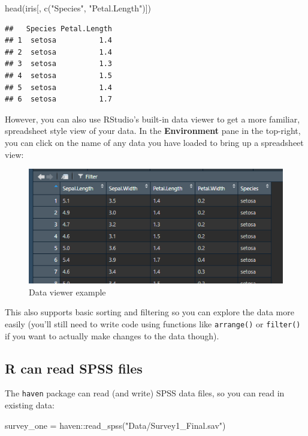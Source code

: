 \documentclass[
]{book}
\newenvironment{Shaded}{\begin{snugshade}}{\end{snugshade}}
\newcommand{\FunctionTok}[1]{\textcolor[rgb]{0.00,0.00,0.00}{#1}}
\newcommand{\NormalTok}[1]{#1}
\newcommand{\OtherTok}[1]{\textcolor[rgb]{0.56,0.35,0.01}{#1}}
\newcommand{\SpecialCharTok}[1]{\textcolor[rgb]{0.00,0.00,0.00}{#1}}
\newcommand{\StringTok}[1]{\textcolor[rgb]{0.31,0.60,0.02}{#1}}
\begin{document}
\begin{Shaded}
\begin{Highlighting}[]
\FunctionTok{head}\NormalTok{(iris[, }\FunctionTok{c}\NormalTok{(}\StringTok{"Species"}\NormalTok{, }\StringTok{"Petal.Length"}\NormalTok{)])}
\end{Highlighting}
\end{Shaded}

\begin{verbatim}
##   Species Petal.Length
## 1  setosa          1.4
## 2  setosa          1.4
## 3  setosa          1.3
## 4  setosa          1.5
## 5  setosa          1.4
## 6  setosa          1.7
\end{verbatim}

However, you can also use RStudio's built-in data viewer to get a more
familiar, spreadsheet style view of your data. In the \textbf{Environment}
pane in the top-right, you can click on the name of any data you
have loaded to bring up a spreadsheet view:

\begin{figure}
\centering
\includegraphics{Images/RstudioDataViewer.png}
\caption{Data viewer example}
\end{figure}

This also supports basic sorting and filtering so you can explore
the data more easily (you'll still need to write code using functions
like \texttt{arrange()} or \texttt{filter()} if you want to actually make
changes to the data though).

\hypertarget{r-can-read-spss-files}{%
\subsection{R can read SPSS files}\label{r-can-read-spss-files}}

The \texttt{haven} package can read (and write) SPSS data files, so you
can read in existing data:

\begin{Shaded}
\begin{Highlighting}[]
\NormalTok{survey\_one }\OtherTok{=}\NormalTok{ haven}\SpecialCharTok{::}\FunctionTok{read\_spss}\NormalTok{(}\StringTok{"Data/Survey1\_Final.sav"}\NormalTok{)}
\end{Highlighting}
\end{Shaded}
\end{document}
